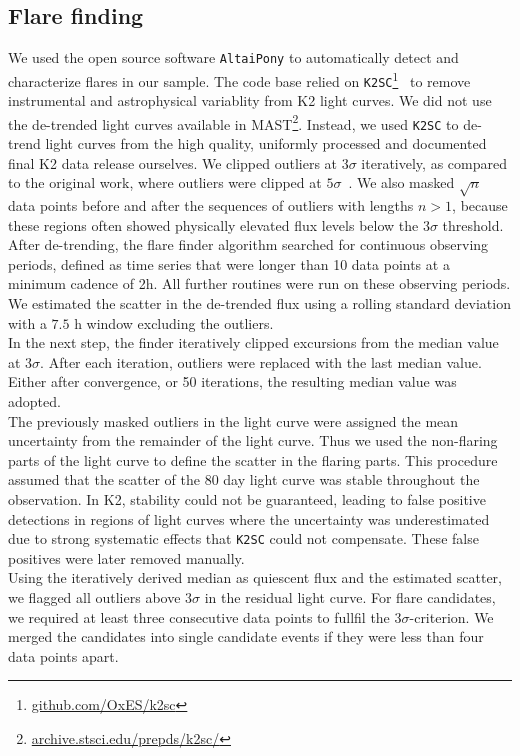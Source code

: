 \documentclass{aa}
\begin{document}
\subsection{Flare finding}
\label{sec:sec:flarefinding}
We used the open source software \texttt{AltaiPony} to automatically detect and characterize flares in our sample. The code base relied on \texttt{K2SC}\footnote{\url{github.com/OxES/k2sc}}~\citep{aigrain_k2sc_2016} to remove instrumental and astrophysical variablity from K2 light curves. We did not use the de-trended light curves available in MAST\footnote{\url{archive.stsci.edu/prepds/k2sc/}}. Instead, we used \texttt{K2SC} to de-trend light curves from the high quality, uniformly processed and documented final K2 data release ourselves. We clipped outliers at $3\sigma$ iteratively, as compared to the original work, where outliers were clipped at $5\sigma$~\citep{aigrain_k2sc_2016}. We also masked $\sqrt{n}$ data points before and after the sequences of outliers with lengths $n>1$, because these regions often showed physically elevated flux levels below the $3\sigma$ threshold.
\\
After de-trending, the flare finder algorithm searched for continuous observing periods, defined as time series that were longer than 10 data points at a minimum cadence of 2\;h. All further routines were run on these observing periods. We estimated the scatter in the de-trended flux using a rolling standard deviation with a $7.5$ h window excluding the outliers. 
\\
In the next step, the finder iteratively clipped excursions from the median value at $3\sigma$. After each iteration, outliers were replaced with the last median value. Either after convergence, or 50 iterations, the resulting median value was adopted. 
\\
The previously masked outliers in the light curve were assigned the mean uncertainty from the remainder of the light curve. Thus we used the non-flaring parts of the light curve to define the scatter in the flaring parts. This procedure assumed that the scatter of the 80 day light curve was stable throughout the observation. In K2, stability could not be guaranteed, leading to false positive detections in regions of light curves where the uncertainty was underestimated due to strong systematic effects that \texttt{K2SC} could not compensate. These false positives were later removed manually. 
\\
Using the iteratively derived median as quiescent flux and the estimated scatter, we flagged all outliers above $3\sigma$ in the residual light curve. For flare candidates, we required at least three consecutive data points to fullfil the $3\sigma$-criterion. We merged the candidates into single candidate events if they were less than four data points apart. 
\end{document}
